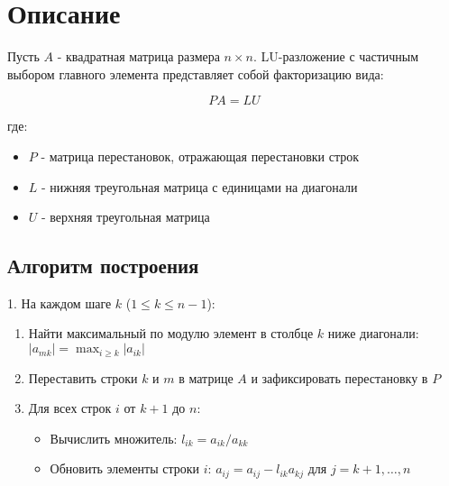 

\section*{Описание}

Пусть $A$ - квадратная матрица размера $n \times n$. LU-разложение с частичным выбором главного элемента представляет собой факторизацию вида:

\begin{equation}
PA = LU
\end{equation}

где:
\begin{itemize}
\item $P$ - матрица перестановок, отражающая перестановки строк
\item $L$ - нижняя треугольная матрица с единицами на диагонали
\item $U$ - верхняя треугольная матрица
\end{itemize}

\subsection*{Алгоритм построения}

1. На каждом шаге $k$ ($1 \leq k \leq n-1$):
\begin{enumerate}
\item Найти максимальный по модулю элемент в столбце $k$ ниже диагонали: $|a_{mk}| = \max_{i \geq k} |a_{ik}|$
\item Переставить строки $k$ и $m$ в матрице $A$ и зафиксировать перестановку в $P$
\item Для всех строк $i$ от $k+1$ до $n$:
\begin{itemize}
\item Вычислить множитель: $l_{ik} = a_{ik}/a_{kk}$
\item Обновить элементы строки $i$: $a_{ij} = a_{ij} - l_{ik}a_{kj}$ для $j=k+1,\ldots,n$
\end{itemize}
\end{enumerate}

